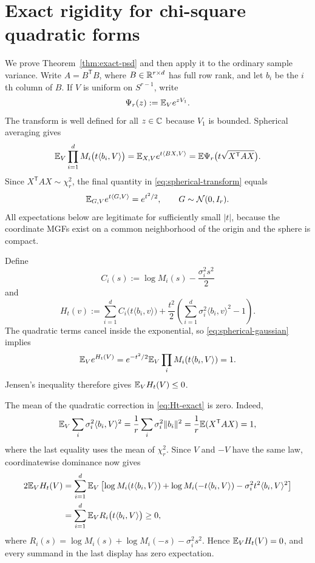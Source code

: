 \section{Exact rigidity for chi-square quadratic forms}\label{sec:exact}

We prove Theorem~\ref{thm:exact-psd} and then apply it to the ordinary sample variance. Write $A=B^{\mathsf T}B$, where $B\in\mathbb R^{r\times d}$ has full row rank, and let $b_i$ be the $i$th column of $B$. If $V$ is uniform on $S^{r-1}$, write
\[
\Psi_r(z):=\mathbb E_V e^{zV_1}.
\]
The transform is well defined for all $z\in\mathbb C$ because $V_1$ is bounded. Spherical averaging gives
\begin{equation}\label{eq:spherical-transform}
\mathbb E_V\prod_{i=1}^d M_i\bigl(t\langle b_i,V\rangle\bigr)
 =\mathbb E_{X,V}e^{t\langle BX,V\rangle}
 =\mathbb E\Psi_r\bigl(t\sqrt{X^{\mathsf T}AX}\bigr).
\end{equation}
Since $X^{\mathsf T}AX\sim\chi_r^2$, the final quantity in \eqref{eq:spherical-transform} equals
\begin{equation}\label{eq:spherical-gaussian}
\mathbb E_{G,V}e^{t\langle G,V\rangle}=e^{t^2/2},
\qquad G\sim\mathcal N(0,I_r).
\end{equation}
All expectations below are legitimate for sufficiently small $|t|$, because the coordinate MGFs exist on a common neighborhood of the origin and the sphere is compact.

Define
\[
C_i(s):=\log M_i(s)-\frac{\sigma_i^2s^2}{2}
\]
and
\begin{equation}\label{eq:Ht-exact}
H_t(v):=\sum_{i=1}^d C_i\bigl(t\langle b_i,v\rangle\bigr)
 +\frac{t^2}{2}\left(\sum_{i=1}^d\sigma_i^2\langle b_i,v\rangle^2-1\right).
\end{equation}
The quadratic terms cancel inside the exponential, so \eqref{eq:spherical-gaussian} implies
\[
\mathbb E_V e^{H_t(V)}=e^{-t^2/2}\mathbb E_V\prod_iM_i(t\langle b_i,V\rangle)=1.
\]
Jensen's inequality therefore gives $\mathbb E_VH_t(V)\le0$.

The mean of the quadratic correction in \eqref{eq:Ht-exact} is zero. Indeed,
\[
\mathbb E_V\sum_i\sigma_i^2\langle b_i,V\rangle^2
 =\frac1r\sum_i\sigma_i^2\|b_i\|^2
 =\frac1r\mathbb E(X^{\mathsf T}AX)=1,
\]
where the last equality uses the mean of $\chi_r^2$. Since $V$ and $-V$ have the same law, coordinatewise dominance now gives
\begin{align*}
2\mathbb E_VH_t(V)
 &=\sum_{i=1}^d\mathbb E_V\left[
 \log M_i(t\langle b_i,V\rangle)+\log M_i(-t\langle b_i,V\rangle)
 -\sigma_i^2t^2\langle b_i,V\rangle^2\right]\\
 &=\sum_{i=1}^d\mathbb E_V R_i\bigl(t\langle b_i,V\rangle\bigr)\ge0,
\end{align*}
where $R_i(s)=\log M_i(s)+\log M_i(-s)-\sigma_i^2s^2$. Hence $\mathbb E_VH_t(V)=0$, and every summand in the last display has zero expectation.

